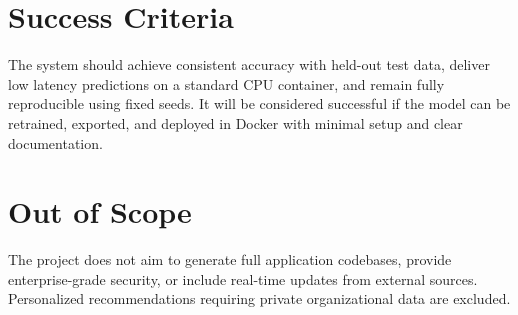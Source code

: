 \documentclass{article}
\begin{document}
\section{Success Criteria}
The system should achieve consistent accuracy with held-out test data, deliver low latency predictions on a standard CPU container, and remain fully reproducible using fixed seeds. It will be considered successful if the model can be retrained, exported, and deployed in Docker with minimal setup and clear documentation.  

\section{Out of Scope}
The project does not aim to generate full application codebases, provide enterprise-grade security, or include real-time updates from external sources. Personalized recommendations requiring private organizational data are excluded.  
 
\end{document}
